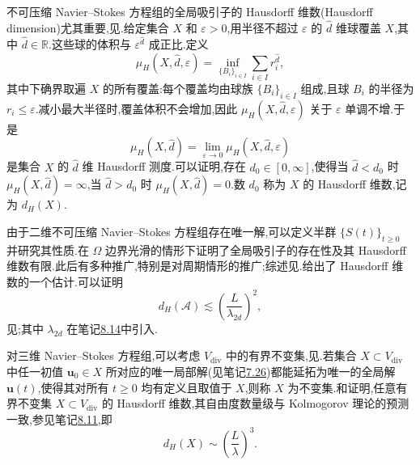 \begin{note}
\label{note:global-attractor-hausdorff-dimension}
不可压缩 Navier--Stokes 方程组的全局吸引子的 Hausdorff 维数(Hausdorff dimension)尤其重要,见\textcite[p.~117]{FoiasManleyRosaTemam2001}.给定集合 $X$ 和 $\varepsilon>0$,用半径不超过 $\varepsilon$ 的 $\hat d$ 维球覆盖 $X$,其中 $\hat d\in\mathbb{R}$.这些球的体积与 $\varepsilon^{\hat d}$ 成正比.定义
\[
 \mu_H(X,\hat d,\varepsilon)
  =\inf_{\{B_i\}_{i\in I}}\sum_{i\in I}r_i^{\hat d},
\]
其中下确界取遍 $X$ 的所有覆盖:每个覆盖均由球族 $\{B_i\}_{i\in I}$ 组成,且球 $B_i$ 的半径为 $r_i\le\varepsilon$.减小最大半径时,覆盖体积不会增加,因此 $\mu_H(X,\hat d,\varepsilon)$ 关于 $\varepsilon$ 单调不增.于是
\[
 \mu_H(X,\hat d)
  =\lim_{\varepsilon\to0}\mu_H(X,\hat d,\varepsilon)
\]
是集合 $X$ 的 $\hat d$ 维 Hausdorff 测度.可以证明,存在 $d_0\in[0,\infty]$,使得当 $\hat d<d_0$ 时 $\mu_H(X,\hat d)=\infty$,当 $\hat d>d_0$ 时 $\mu_H(X,\hat d)=0$.数 $d_0$ 称为 $X$ 的 Hausdorff 维数,记为 $d_H(X)$.
\end{note}

\begin{note}
\label{note:two-dimensional-navier-stokes-results}
由于二维不可压缩 Navier--Stokes 方程组存在唯一解,可以定义半群 $\{S(t)\}_{t\ge0}$ 并研究其性质.\textcite{FoiasTemam1979}在 $\Omega$ 边界光滑的情形下证明了全局吸引子的存在性及其 Hausdorff 维数有限.此后有多种推广,特别是对周期情形的推广;综述见\textcite[p.~140]{FoiasManleyRosaTemam2001}.\textcite{Temam1986}给出了 Hausdorff 维数的一个估计.可以证明
\[
 d_H(\mathcal{A})\lesssim
  \left(\frac{L}{\lambda_{2d}}\right)^2,
\]
见\textcite[p.~141]{FoiasManleyRosaTemam2001};其中 $\lambda_{2d}$ 在笔记\hyperref[note:two-three-dimensional-flow-differences]{8.14}中引入.
\end{note}

\begin{note}
\label{note:three-dimensional-navier-stokes-extensions}
对三维 Navier--Stokes 方程组,可以考虑 $V_{\mathrm{div}}$ 中的有界不变集,见\textcite[p.~147]{FoiasManleyRosaTemam2001}.若集合 $X\subset V_{\mathrm{div}}$ 中任一初值 $\bm{u}_0\in X$ 所对应的唯一局部解(见笔记\hyperref[note:time-dependent-local-existence-small-data]{7.26})都能延拓为唯一的全局解 $\bm{u}(t)$,使得其对所有 $t\ge0$ 均有定义且取值于 $X$,则称 $X$ 为不变集.\textcite{ConstantinFoiasManleyTemam1985b}和\textcite{ConstantinFoiasTemam1985a}证明,任意有界不变集 $X\subset V_{\mathrm{div}}$ 的 Hausdorff 维数,其自由度数量级与 Kolmogorov 理论的预测一致,参见笔记\hyperref[note:kolmogorov-scales-numerical-impact]{8.11},即
\begin{equation}\label{eq:hausdorff-dimension-three-dimensional-invariant-set}
 d_H(X)\sim\left(\frac{L}{\lambda}\right)^3.
\end{equation}
\end{note}

